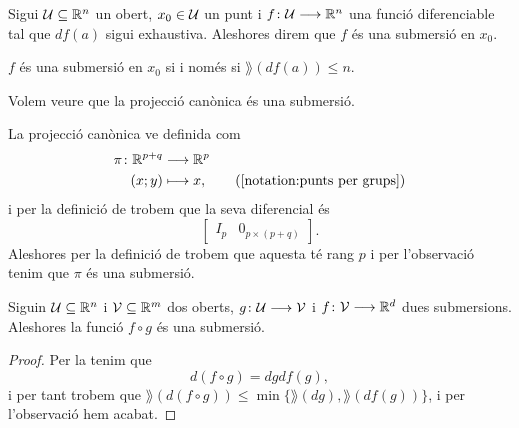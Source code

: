 \documentclass[../Apunts.tex]{subfiles}
\begin{document}
	\begin{definition}[Submersió]
		\label{def:submersió}
		Sigui \(\mathcal{U}\subseteq\mathbb{R}^{n}\) un obert, \(x_{0}\in\mathcal{U}\) un punt i \(f\colon\mathcal{U}\longrightarrow\mathbb{R}^{n}\) una funció diferenciable tal que \(df(a)\) sigui exhaustiva. Aleshores direm que \(f\) és una submersió en \(x_{0}\).
	\end{definition}
	\begin{observation}
		\label{obs:submersió si i només si té rang més petit o igual}
		\(f\) és una submersió en \(x_{0}\) si i només si \(\rang(df(a))\leq n\).
	\end{observation}
	\begin{example}
		Volem veure que la projecció canònica és una submersió.
		\begin{solution}
			La projecció canònica ve definida com
			\begin{align*}
				\pi\colon\mathbb{R}^{p+q}&\longrightarrow\mathbb{R}^{p} \\
				(x;y)&\longmapsto x, \tag{\ref{notation:punts per grups}}
			\end{align*}
			i per la definició de  trobem que la seva diferencial és
			\[\left[\begin{array}{c|c}
			I_{p} & 0_{p\times(p+q)}
			\end{array}\right].\]
			Aleshores per la definició de  trobem que aquesta té rang \(p\) i per l'observació  tenim que \(\pi\) és una submersió.
		\end{solution}
	\end{example}
	\begin{proposition}
		\label{prop:la composició de submersions és submersió}
		Siguin \(\mathcal{U}\subseteq\mathbb{R}^{n}\) i \(\mathcal{V}\subseteq\mathbb{R}^{m}\) dos oberts, \(g\colon\mathcal{U}\longrightarrow\mathcal{V}\) i \(f\colon\mathcal{V}\longrightarrow\mathbb{R}^{d}\) dues submersions. Aleshores la funció \(f\circ g\) és una submersió.
		\begin{proof}
			Per la  tenim que
			\[d(f\circ g)=dgdf(g),\]
			i per tant trobem que \(\rang(d(f\circ g))\leq\min\{\rang(dg),\rang(df(g))\}\), i per l'observació  hem acabat.
		\end{proof}
	\end{proposition}
\end{document}
